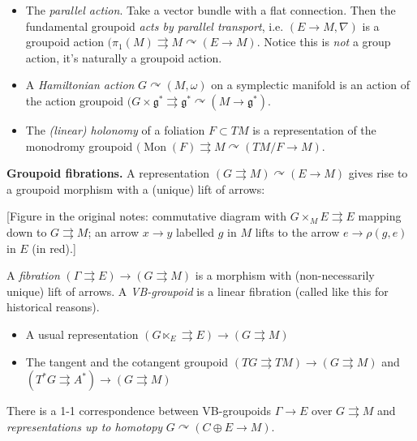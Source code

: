 \begin{example}
\label{example-hoyo-actions}
\begin{itemize}
\item The \emph{parallel action}. Take a
vector bundle with a flat connection. Then
the fundamental groupoid \emph{acts by
parallel transport}, i.e. $(E \to M, \nabla)$
is a groupoid action
$(\pi_{1}(M)\rightrightarrows M
\curvearrowright (E \to M)$. Notice this is
\emph{not} a group action, it's naturally a
groupoid action.
\item A \emph{Hamiltonian action} $G
\curvearrowright(M,\omega)$ on a symplectic
manifold is an action of the action groupoid
$(G \times
\mathfrak{g}^*\rightrightarrows\mathfrak{g}^*
\curvearrowright(M\to
\mathfrak{g}^*)$.
\item The \emph{(linear) holonomy} of a
foliation $F \subset TM$ is a representation
of the monodromy groupoid
$(\operatorname{Mon}(F) \rightrightarrows M
\curvearrowright(TM/F \to M)$.
\end{itemize}
\end{example}

\medskip\noindent
{\bf Groupoid fibrations.}
A representation $(G\rightrightarrows
M)\curvearrowright(E \to M)$ gives rise to a
groupoid morphism with a (unique) lift of
arrows:

[Figure in the original notes: commutative
diagram with $G \times_M E \rightrightarrows
E$ mapping down to $G\rightrightarrows M$; an
arrow $x \to y$ labelled $g$ in $M$ lifts to
the arrow $e \to \rho(g,e)$ in $E$ (in red).]

A \emph{fibration} $(\Gamma \rightrightarrows
E) \to (G \rightrightarrows M)$ is a morphism
with (non-necessarily unique) lift of arrows.
A \emph{VB-groupoid} is a linear fibration
(called like this for historical reasons).

\begin{example}
\label{example-hoyo-fibrations}
\begin{itemize}
\item A usual representation $(G \ltimes_E
\rightrightarrows E) \to (G \rightrightarrows
M)$
\item The tangent and the cotangent groupoid
$(TG \rightrightarrows TM) \to (G
\rightrightarrows M)$ and $(T^*G
\rightrightarrows A^*) \to
(G\rightrightarrows M)$
\end{itemize}
\end{example}
\begin{theorem}
\label{theorem-hoyo-vb-groupoids}
There is a 1-1 correspondence between
VB-groupoids $\Gamma\to E$ over $G
\rightrightarrows M$ and
\emph{representations up to homotopy}
$G\curvearrowright(C \oplus E \to M)$.
\end{theorem}

